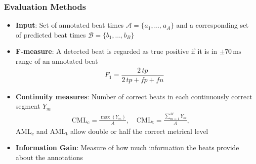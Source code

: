 \documentclass{beamer}
\begin{document}
\begin{frame}
\frametitle{Evaluation Methods}

\begin{itemize}
\item \textbf{Input}: Set of annotated beat times $\mathcal A = \{a_1, \dots, a_A\}$ and a corresponding set of predicted beat times $\mathcal B = \{b_1, \dots, b_B\}$
\item \textbf{F-measure}: A detected beat is regarded as true positive if it is in $\pm 70\,\text{ms}$ range of an annotated beat
\begin{align}
F_1= \dfrac{2\, tp}{2\, tp + fp + fn}
\end{align} 
\item \textbf{Continuity measures}: Number of correct beats in each continuously correct segment $Y_m$
\begin{align}
\text{CML}_\text{c} = \frac{\max(Y_m)}{A}, \quad
\text{CML}_\text{t} = \frac{\sum_{m=1}^MY_m}{A},\quad
\end{align} 
$\text{AML}_\text{c}$ and $\text{AML}_\text{t}$ allow double or half the correct metrical level
\item \textbf{Information Gain}: Measure of how much information the beats provide about the annotations \cite{Davies2009b}
\end{itemize}
\end{frame}
\end{document}
